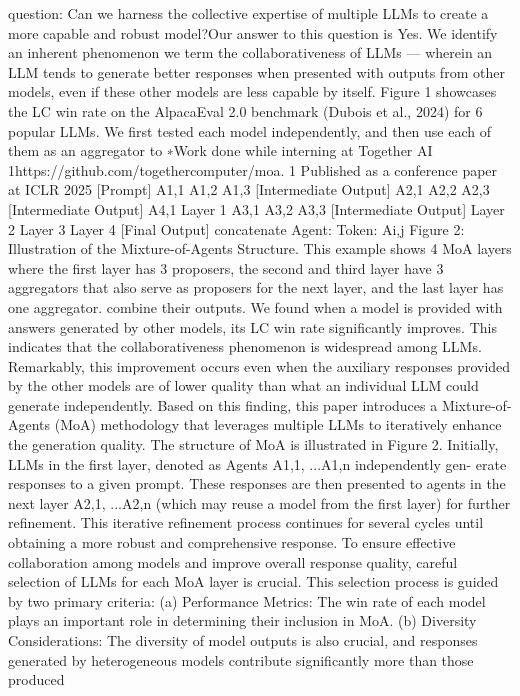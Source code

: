 question: Can we harness the collective expertise of multiple LLMs to create a more capable and
robust model?Our answer to this question is Yes. We identify an inherent phenomenon we term the
collaborativeness of LLMs — wherein an LLM tends to generate better responses when presented
with outputs from other models, even if these other models are less capable by itself. Figure 1
showcases the LC win rate on the AlpacaEval 2.0 benchmark (Dubois et al., 2024) for 6 popular
LLMs. We first tested each model independently, and then use each of them as an aggregator to
∗Work done while interning at Together AI
1https://github.com/togethercomputer/moa.
1
Published as a conference paper at ICLR 2025
[Prompt]
A1,1
A1,2
A1,3
[Intermediate Output]
A2,1
A2,2
A2,3
[Intermediate Output]
A4,1
Layer 1
A3,1
A3,2
A3,3
[Intermediate Output]
Layer 2
Layer 3
Layer 4
[Final Output]
concatenate
Agent:
Token:
Ai,j
Figure 2: Illustration of the Mixture-of-Agents Structure. This example shows 4 MoA layers where
the first layer has 3 proposers, the second and third layer have 3 aggregators that also serve as
proposers for the next layer, and the last layer has one aggregator.
combine their outputs. We found when a model is provided with answers generated by other models,
its LC win rate significantly improves. This indicates that the collaborativeness phenomenon is
widespread among LLMs. Remarkably, this improvement occurs even when the auxiliary responses
provided by the other models are of lower quality than what an individual LLM could generate
independently.
Based on this finding, this paper introduces a Mixture-of-Agents (MoA) methodology that leverages
multiple LLMs to iteratively enhance the generation quality. The structure of MoA is illustrated
in Figure 2. Initially, LLMs in the first layer, denoted as Agents A1,1, ...A1,n independently gen-
erate responses to a given prompt. These responses are then presented to agents in the next layer
A2,1, ...A2,n (which may reuse a model from the first layer) for further refinement. This iterative
refinement process continues for several cycles until obtaining a more robust and comprehensive
response.
To ensure effective collaboration among models and improve overall response quality, careful
selection of LLMs for each MoA layer is crucial. This selection process is guided by two primary
criteria: (a) Performance Metrics: The win rate of each model plays an important role in determining
their inclusion in MoA. (b) Diversity Considerations: The diversity of model outputs is also crucial,
and responses generated by heterogeneous models contribute significantly more than those produced
